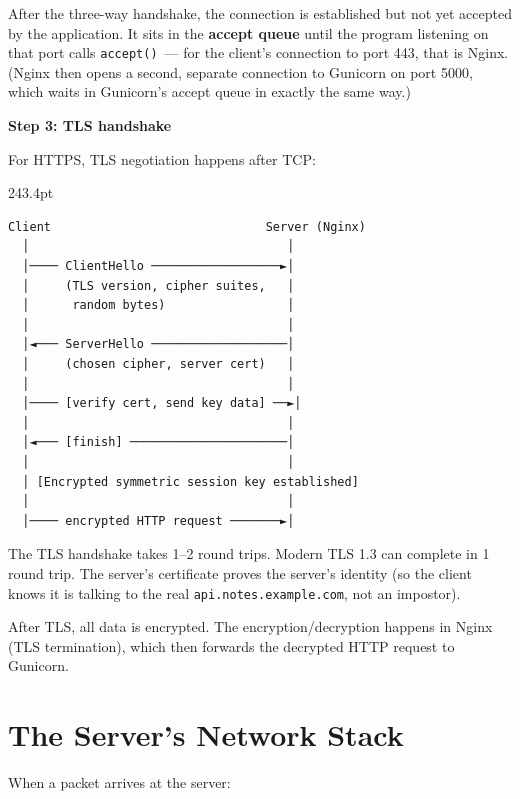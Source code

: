 After the three-way handshake, the connection is established but not yet accepted by the application. It sits in the \textbf{accept queue} until the program listening on that port calls \texttt{accept()}~--- for the client's connection to port 443, that is Nginx. (Nginx then opens a second, separate connection to Gunicorn on port 5000, which waits in Gunicorn's accept queue in exactly the same way.)

\textbf{Step 3: TLS handshake}

For HTTPS, TLS negotiation happens after TCP:

\begin{diagrambox}[short]{243.4pt}
\begin{Verbatim}[fontsize=\fontsize{9.0}{8.55}\selectfont]
Client                              Server (Nginx)
  │                                    │
  │──── ClientHello ──────────────────►│
  │     (TLS version, cipher suites,   │
  │      random bytes)                 │
  │                                    │
  │◄─── ServerHello ───────────────────│
  │     (chosen cipher, server cert)   │
  │                                    │
  │──── [verify cert, send key data] ──►│
  │                                    │
  │◄─── [finish] ──────────────────────│
  │                                    │
  │ [Encrypted symmetric session key established]
  │                                    │
  │──── encrypted HTTP request ───────►│
\end{Verbatim}
\end{diagrambox}

\noindent{}The TLS handshake takes 1--2 round trips. Modern TLS 1.3 can complete in 1 round trip. The server's certificate proves the server's identity (so the client knows it is talking to the real \texttt{api.notes.example.com}, not an impostor).

After TLS, all data is encrypted. The encryption/decryption happens in Nginx (TLS termination), which then forwards the decrypted HTTP request to Gunicorn.

\setcounter{section}{2}
\section{The Server's Network Stack}\label{26-network-stack-flow:263-the-servers-network-stack}

When a packet arrives at the server:

